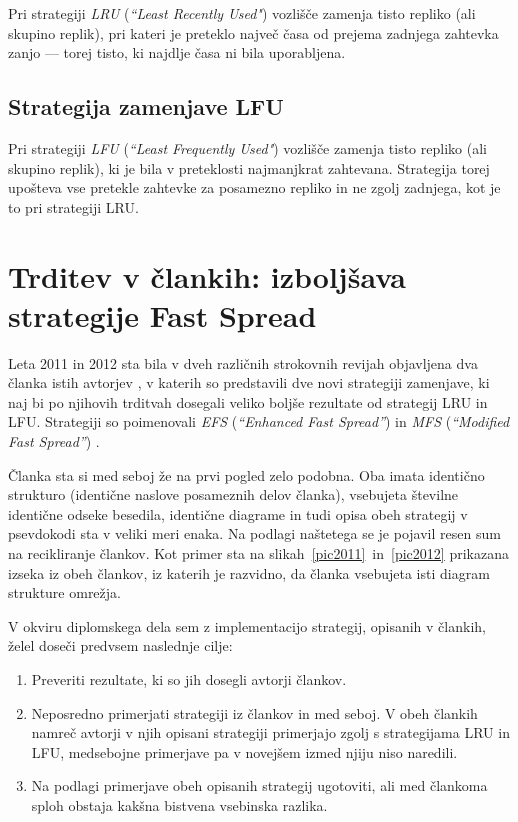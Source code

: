 \documentclass[a4paper, 12pt]{book}
\newcommand{\newterm}{\textit}
\begin{document}
Pri strategiji \newterm{LRU} (\newterm{``Least Recently Used"}) vozlišče
zamenja tisto repliko (ali skupino replik), pri kateri je preteklo največ
časa od prejema zadnjega zahtevka zanjo --- torej tisto, ki najdlje časa
ni bila uporabljena.

\subsection{Strategija zamenjave LFU}

Pri strategiji \newterm{LFU} (\newterm{``Least Frequently Used"}) vozlišče
zamenja tisto repliko (ali skupino replik), ki je bila v preteklosti
najmanjkrat zahtevana. Strategija torej upošteva vse pretekle zahtevke za
posamezno repliko in ne zgolj zadnjega, kot je to pri strategiji LRU.

\section{Trditev v člankih: izboljšava strategije Fast Spread}

Leta 2011 in 2012 sta bila v dveh različnih strokovnih revijah objavljena
dva članka istih avtorjev \cite{efs2011, mfs2012}, v katerih so predstavili dve
novi strategiji zamenjave, ki naj bi po njihovih trditvah dosegali veliko boljše
rezultate od strategij LRU in LFU. Strategiji so poimenovali \newterm{EFS}
(\newterm{``Enhanced Fast Spread''}) \cite{efs2011} in \newterm{MFS}
(\newterm{``Modified Fast Spread''}) \cite{mfs2012}.

Članka sta si med seboj že na prvi pogled zelo podobna. Oba imata identično
strukturo (identične naslove posameznih delov članka), vsebujeta številne
identične odseke besedila, identične diagrame in tudi opisa obeh strategij
v psevdokodi sta v veliki meri enaka. Na podlagi naštetega se je pojavil
resen sum na recikliranje člankov. Kot primer sta na
slikah~\ref{pic2011}~in~\ref{pic2012} prikazana izseka iz obeh člankov,
iz katerih je razvidno, da članka vsebujeta isti diagram strukture omrežja.

V okviru diplomskega dela sem z implementacijo strategij, opisanih v
člankih, želel doseči predvsem naslednje cilje:
\label{cilji}

\begin{enumerate}
\item Preveriti rezultate, ki so jih dosegli avtorji člankov.

\item Neposredno primerjati strategiji iz člankov \cite{efs2011} in
\cite{mfs2012} med seboj. V obeh člankih namreč avtorji v njih opisani
strategiji primerjajo zgolj s strategijama LRU in LFU, medsebojne
primerjave pa v novejšem izmed njiju \cite{mfs2012} niso naredili.

\item Na podlagi primerjave obeh opisanih strategij ugotoviti, ali med
član\-koma sploh obstaja kakšna bistvena vsebinska razlika.
\end{enumerate}
\end{document}
